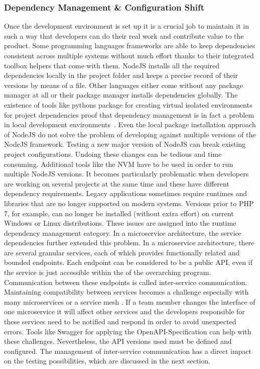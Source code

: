 \documentclass[12pt, a4paper]{article}
\begin{document}
        \subsubsection{Dependency Management \& Configuration Shift}\label{sss::dependency}
        Once the development environment is set up it is a crucial job to maintain it in such a way that developers can do their real work and contribute value to the product. Some programming languages frameworks are able to keep dependencies consistent across multiple systems without much effort thanks to their integrated toolbox helpers that come with them. NodeJS installs all the required dependencies locally in the project folder and keeps a precise record of their versions by means of a  file. Other languages either come without any package manager at all or their package manager installs dependencies globally. The existence of tools like pythons  package for creating virtual isolated environments for project dependencies proof that dependency management is in fact a problem in local development environments~\cite{pythonvenv}. Even the local package installation approach of NodeJS do not solve the problem of developing against multiple versions of the NodeJS framework. Testing a new major version of NodeJS can break existing project configurations. Undoing these changes can be tedious and time consuming. Additional tools like the \ac{NVM} have to be used in order to run multiple NodeJS versions. It becomes particularly problematic when developers are working on several projects at the same time and these have different dependency requirements. Legacy applications sometimes require runtimes and libraries that are no longer supported on modern systems. Versions prior to PHP 7, for example, can no longer be installed (without extra effort) on current Windows or Linux distributions. These issues are assigned into the runtime dependency management category. In a microservice architecture, the service dependencies further extended this problem.\newline
        In a microservice architecture, there are several granular services, each of which provides functionally related and bounded endpoints. Each endpoint can be considered to be a public \ac{API}, even if the service is just accessible within the of the overarching program. Communication between these endpoints is called inter-service communication. Maintaining compatibility between services becomes a challenge especially with many microservices or a service mesh \cite{micro}. If a team member changes the interface of one microservice it will affect other services and the developers responsible for these services need to be notified and respond in order to avoid unexpected errors. Tools like Swagger for applying the OpenAPI-Specification can help with these challenges. Nevertheless, the API versions used must be defined and configured. The management of inter-service communication has a direct impact on the testing possibilities, which are discussed in the next section.\newline
\end{document}
